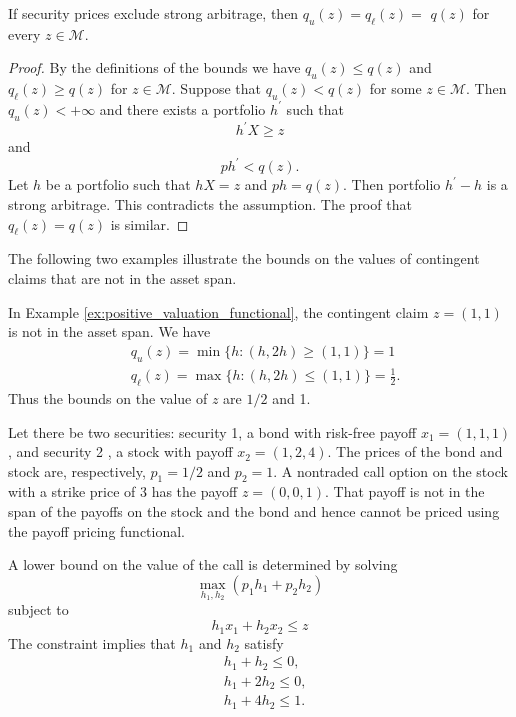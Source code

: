\documentclass[\topdir/lecture\_notes.tex]{subfiles}
\begin{document}
\begin{optional}
\begin{proposition} \label{prop:bounds_equal_pricing}
If security prices exclude strong arbitrage, then $q_{u}(z)=q_{\ell}(z)=$ $q(z)$ for every $z \in \mathcal{M}$.
\end{proposition}
\begin{proof}
By the definitions of the bounds we have $q_{u}(z) \leq q(z)$ and $q_{\ell}(z) \geq q(z)$ for $z \in \mathcal{M}$. Suppose that $q_{u}(z)<q(z)$ for some $z \in \mathcal{M}$. Then $q_{u}(z)<+\infty$ and there exists a portfolio $h^{\prime}$ such that
\begin{equation*}
h^{\prime} X \geq z 
\end{equation*}
and
\begin{equation*}
p h^{\prime}<q(z) . 
\end{equation*}
Let $h$ be a portfolio such that $h X=z$ and $p h=q(z)$. Then portfolio $h^{\prime}-h$ is a strong arbitrage. This contradicts the assumption. The proof that $q_{\ell}(z)=q(z)$ is similar.
\end{proof}

The following two examples illustrate the bounds on the values of contingent claims that are not in the asset span.

\begin{example}\label{ex:call_option_bounds_simple}
In Example \ref{ex:positive_valuation_functional}, the contingent claim $z=(1,1)$ is not in the asset span. We have
\begin{align}
& q_{u}(z)=\min \{h:(h, 2 h) \geq(1,1)\}=1 \label{4.7}\\
& q_{\ell}(z)=\max \{h:(h, 2 h) \leq(1,1)\}=\frac{1}{2} . \label{4.8}
\end{align}
Thus the bounds on the value of $z$ are $1 / 2$ and 1.
\end{example}
\begin{example}\label{ex:call_option_bounds_detailed}
Let there be two securities: security 1, a bond with risk-free payoff $x_{1}=(1,1,1)$, and security 2 , a stock with payoff $x_{2}=(1,2,4)$. The prices of the bond and stock are, respectively, $p_{1}=1 / 2$ and $p_{2}=1$. A nontraded call option on the stock with a strike price of 3 has the payoff $z=(0,0,1)$. That payoff is not in the span of the payoffs on the stock and the bond and hence cannot be priced using the payoff pricing functional.

A lower bound on the value of the call is determined by solving
\begin{equation}
\max _{h_{1}, h_{2}}\left(p_{1} h_{1}+p_{2} h_{2}\right) \label{eq:call_lower_bound}
\end{equation}
subject to
\begin{equation*}
h_{1} x_{1}+h_{2} x_{2} \leq z 
\end{equation*}
The constraint implies that $h_{1}$ and $h_{2}$ satisfy
\begin{align}
& h_{1}+h_{2} \leq 0, \label{eq:call_constraint_1}\\
& h_{1}+2 h_{2} \leq 0, \label{eq:call_constraint_2}\\
& h_{1}+4 h_{2} \leq 1 . \label{eq:call_constraint_3}
\end{align}


\end{example}
\end{optional}
\end{document}
